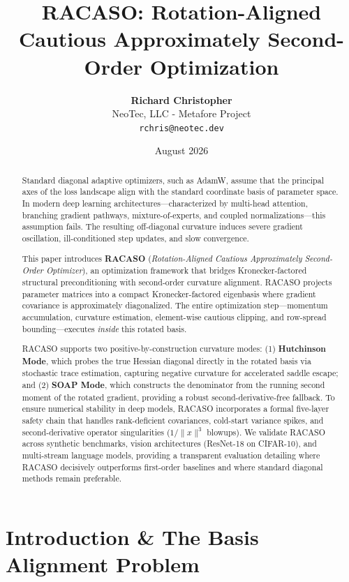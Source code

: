 \documentclass[11pt,a4paper]{article}
\title{\textbf{RACASO: Rotation-Aligned Cautious Approximately Second-Order Optimization}}
\author{
    \textbf{Richard Christopher} \\
    NeoTec, LLC - Metafore Project \\
    \texttt{rchris@neotec.dev}
}
\date{August 2026}
\begin{document}
\maketitle

\begin{abstract}
Standard diagonal adaptive optimizers, such as AdamW, assume that the principal axes of the loss landscape align with the standard coordinate basis of parameter space. In modern deep learning architectures---characterized by multi-head attention, branching gradient pathways, mixture-of-experts, and coupled normalizations---this assumption fails. The resulting off-diagonal curvature induces severe gradient oscillation, ill-conditioned step updates, and slow convergence. 

This paper introduces \textbf{RACASO} (\emph{Rotation-Aligned Cautious Approximately Second-Order Optimizer}), an optimization framework that bridges Kronecker-factored structural preconditioning with second-order curvature alignment. RACASO projects parameter matrices into a compact Kronecker-factored eigenbasis where gradient covariance is approximately diagonalized. The entire optimization step---momentum accumulation, curvature estimation, element-wise cautious clipping, and row-spread bounding---executes \emph{inside} this rotated basis. 

RACASO supports two positive-by-construction curvature modes: (1) \textbf{Hutchinson Mode}, which probes the true Hessian diagonal directly in the rotated basis via stochastic trace estimation, capturing negative curvature for accelerated saddle escape; and (2) \textbf{SOAP Mode}, which constructs the denominator from the running second moment of the rotated gradient, providing a robust second-derivative-free fallback. To ensure numerical stability in deep models, RACASO incorporates a formal five-layer safety chain that handles rank-deficient covariances, cold-start variance spikes, and second-derivative operator singularities ($1/\|x\|^3$ blowups). We validate RACASO across synthetic benchmarks, vision architectures (ResNet-18 on CIFAR-10), and multi-stream language models, providing a transparent evaluation detailing where RACASO decisively outperforms first-order baselines and where standard diagonal methods remain preferable.
\end{abstract}

\section{Introduction \& The Basis Alignment Problem}
\end{document}
